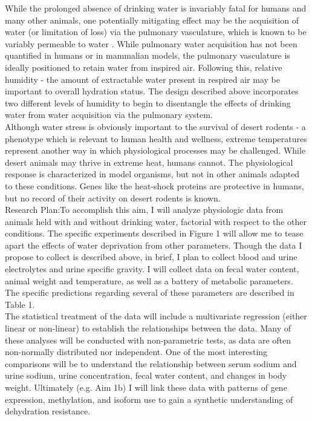 \documentclass[11pt]{article}
\begin{document}
While the prolonged absence of drinking water is invariably fatal for humans and many other animals, one potentially mitigating effect may be the acquisition of water (or limitation of loss) via the pulmonary vasculature, which is known to be variably permeable to water \citep{Berger:2011ks,Goralski:2010eo}. While pulmonary water acquisition has not been quantified in humans or in mammalian models, the pulmonary vasculature is ideally positioned to retain water from inspired air. Following this, relative humidity -  the amount of extractable water present in respired air may be important to overall hydration status. The design described above incorporates two different levels of humidity to begin to disentangle the effects of drinking water from water acquisition via the pulmonary system. \\



Although water stress is obviously important to the survival of desert rodents - a phenotype which is relevant to human health and wellness, extreme temperatures represent another way in which physiological processes may be challenged. While desert animals may thrive in extreme heat, humans cannot. The physiological response is characterized in model organisms, but not in other animals adapted to these conditions. Genes like the heat-shock proteins are protective in humans, but no record of their activity on desert rodents is known. \\

Research Plan:To accomplish this aim, I will analyze physiologic data from animals held with and without drinking water, factorial with respect to the other conditions. The specific experiments described in \hypertarget{Figure 1}{Figure 1} will allow me to tease apart the effects of water deprivation from other parameters. Though the data I propose to collect is described above, in brief, I plan to collect blood and urine electrolytes and urine specific gravity. I will collect data on fecal water content, animal weight and temperature, as well as a battery of metabolic parameters. The specific predictions regarding several of these parameters are described in Table 1.  \\

The statistical treatment of the data will include a multivariate regression (either linear or non-linear) to establish the relationships between the data. Many of these analyses will be conducted with non-parametric tests, as data are often non-normally distributed nor independent. One of the most interesting comparisons will be to understand the relationship between serum sodium and urine sodium, urine concentration, fecal water content, and changes in body weight. Ultimately (e.g. Aim 1b) I will link these data with patterns of gene expression, methylation, and isoform use to gain a synthetic understanding of dehydration resistance. \\
\end{document}
